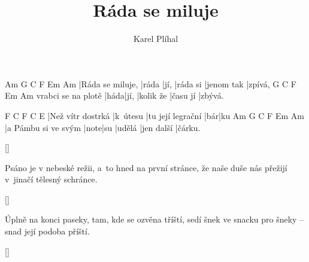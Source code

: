 \documentclass{song}
\author{Karel Plíhal}
\title{Ráda se miluje}
\begin{document}
Am               G     C    F        Em         Am
|Ráda se miluje, |ráda |jí, |ráda si |jenom tak |zpívá,
                   G    C    F         Em       Am
vrabci se na plotě |háda|jí, |kolik že |času jí |zbývá.
\endstrophe

\strophe
F                 C        F                 C   E
|Než vítr dostrká |k~útesu |tu její legrační |bár|ku
Am                  G    C   F      Em         Am
|a Pámbu si ve svým |note|su |udělá |jen další |čárku.
\endstrophe

\ref{}

\strophe*
Psáno je v nebeské režii, a~to hned na první stránce, 
že naše duše nás přežijí v~jinačí tělesný schránce. 
\endstrophe

\ref{}

\strophe*
Úplně na konci paseky, tam, kde se ozvěna tříští, 
sedí šnek ve snacku pro šneky -- snad její podoba příští.
\endstrophe

\ref{}
\end{document}
